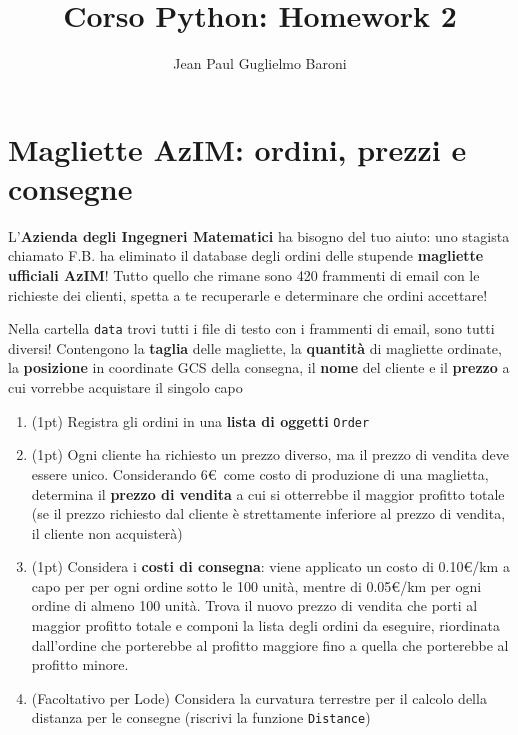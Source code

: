\documentclass[a4paper]{article}
\title{Corso Python: Homework 2}
\author{Jean Paul Guglielmo Baroni}
\date{}
\begin{document}
\maketitle

\section*{Magliette AzIM: ordini, prezzi e consegne}

L'\textbf{Azienda degli Ingegneri Matematici} ha bisogno del tuo aiuto: uno stagista chiamato F.B. ha eliminato il database degli ordini delle stupende \textbf{magliette ufficiali AzIM}! Tutto quello che rimane sono 420 frammenti di email con le richieste dei clienti, spetta a te recuperarle e determinare che ordini accettare!

Nella cartella \verb|data| trovi tutti i file di testo con i frammenti di email, sono tutti diversi! Contengono la \textbf{taglia} delle magliette, la \textbf{quantità} di magliette ordinate, la \textbf{posizione} in coordinate GCS della consegna, il \textbf{nome} del cliente e il \textbf{prezzo} a cui vorrebbe acquistare il singolo capo

\begin{enumerate}
    \item (1pt) Registra gli ordini in una \textbf{lista di oggetti} \verb|Order|
    \item (1pt) Ogni cliente ha richiesto un prezzo diverso, ma il prezzo di vendita deve essere unico. Considerando 6\euro\ come costo di produzione di una maglietta, determina il \textbf{prezzo di vendita} a cui si otterrebbe il maggior profitto totale (se il prezzo richiesto dal cliente è strettamente inferiore al prezzo di vendita, il cliente non acquisterà)
    \item (1pt) Considera i \textbf{costi di consegna}: viene applicato un costo di 0.10€/km a capo per per ogni ordine sotto le 100 unità, mentre di 0.05€/km per ogni ordine di almeno 100 unità. Trova il nuovo prezzo di vendita che porti al maggior profitto totale e componi la lista degli ordini da eseguire, riordinata dall'ordine che porterebbe al profitto maggiore fino a quella che porterebbe al profitto minore.
    \item (Facoltativo per Lode) Considera la curvatura terrestre per il calcolo della distanza per le consegne (riscrivi la funzione \verb|Distance|)
\end{enumerate}
\end{document}
